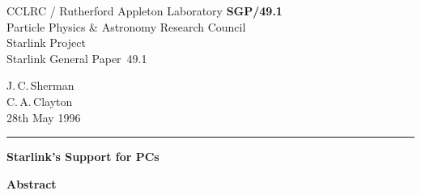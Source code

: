 \documentclass[twoside,11pt]{article}
\newcommand{\stardoccategory}  {Starlink General Paper}
\newcommand{\stardocinitials}  {SGP}
\newcommand{\stardocnumber}    {49.1}
\newcommand{\stardocauthors}   {J.\,C.\,Sherman\\
                                C.\,A.\,Clayton}
\newcommand{\stardocdate}      {28th May 1996}
\newcommand{\stardoctitle}     {Starlink's Support for PCs}
\newcommand{\stardocname}{\stardocinitials /\stardocnumber}
\newenvironment{latexonly}{}{}
\begin{document}
\thispagestyle{empty}

\begin{latexonly}
   CCLRC / {\sc Rutherford Appleton Laboratory} \hfill {\bf \stardocname}\\
   {\large Particle Physics \& Astronomy Research Council}\\
   {\large Starlink Project\\}
   {\large \stardoccategory\ \stardocnumber}
   \begin{flushright}
   \stardocauthors\\
   \stardocdate
   \end{flushright}
   \vspace{-4mm}
   \rule{\textwidth}{0.5mm}
   \vspace{5mm}
   \begin{center}
   {\Large\bf \stardoctitle}
   \end{center}
   \vspace{5mm}

   \vspace{10mm}
   \begin{center}
      {\Large\bf Abstract}
   \end{center}
\end{latexonly}
\end{document}
